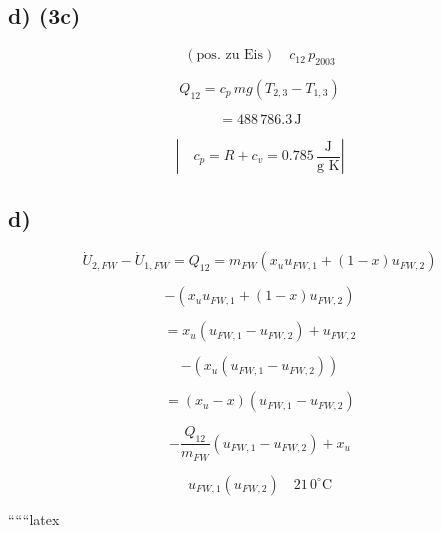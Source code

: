 \subsection*{d) (3c)}

\[
\left( \text{pos. zu Eis} \right) \quad c_{12} \, p_{2003}
\]

\[
Q_{12} = c_p \, m g \left( T_{2,3} - T_{1,3} \right)
\]

\[
= 488 \, 786.3 \, \text{J}
\]

\[
\left| \quad c_p = R + c_v = 0.785 \, \frac{\text{J}}{\text{g K}} \right|
\]



\subsection*{d)}

\[
\dot{U}_{2,FW} - \dot{U}_{1,FW} = Q_{12} = m_{FW} \left( x_u u_{FW,1} + (1 - x) u_{FW,2} \right)
\]

\[
- \left( x_u u_{FW,1} + (1 - x) u_{FW,2} \right)
\]

\[
= x_u \left( u_{FW,1} - u_{FW,2} \right) + u_{FW,2}
\]

\[
- \left( x_u \left( u_{FW,1} - u_{FW,2} \right) \right)
\]

\[
= \left( x_u - x \right) \left( u_{FW,1} - u_{FW,2} \right)
\]

\[
- \frac{Q_{12}}{m_{FW}} \left( u_{FW,1} - u_{FW,2} \right) + x_u
\]

\[
u_{FW,1} \left( u_{FW,2} \right) \quad 21 \, 0^\circ \text{C}
\]

``````latex